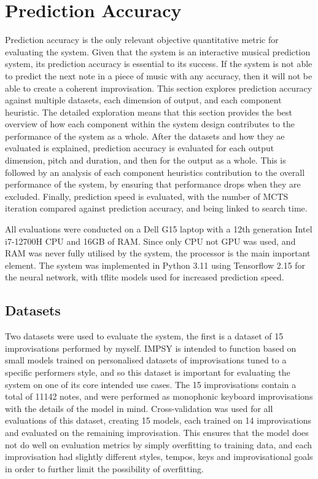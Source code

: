 \section{Prediction Accuracy}
Prediction accuracy is the only relevant objective quantitative metric for evaluating the system. Given that the system is an interactive musical prediction system, its prediction accuracy is essential to its success. If the system is not able to predict the next note in a piece of music with any accuracy, then it will not be able to create a coherent improvisation. This section explores prediction accuracy against multiple datasets, each dimension of output, and each component heuristic. The detailed exploration means that this section provides the best overview of how each component within the system design contributes to the performance of the system as a whole. After the datasets and how they ae evaluated is explained, prediction accuracy is evaluated for each output dimension, pitch and duration, and then for the output as a whole. This is followed by an analysis of each component heuristics contribution to the overall performance of the system, by ensuring that performance drops when they are excluded. Finally, prediction speed is evaluated, with the number of MCTS iteration compared against prediction accuracy, and being linked to search time.

All evaluations were conducted on a Dell G15 laptop with a 12th generation Intel i7-12700H CPU and 16GB of RAM. Since only CPU not GPU was used, and RAM was never fully utilised by the system, the processor is the main important element. The system was implemented in Python 3.11 using Tensorflow 2.15 for the neural network, with tflite models used for increased prediction speed.

\subsection{Datasets}
Two datasets were used to evaluate the system, the first is a dataset of 15 improvisations performed by myself. IMPSY is intended to function based on small models trained on personalised datasets of improvisations tuned to a specific performers style, and so this dataset is important for evaluating the system on one of its core intended use cases. The 15 improvisations contain a total of 11142 notes, and were performed as monophonic keyboard improvisations with the details of the model in mind. Cross-validation was used for all evaluations of this dataset, creating 15 models, each trained on 14 improvisations and evaluated on the remaining improvisation. This ensures that the model does not do well on evaluation metrics by simply overfitting to training data, and each improvisation had slightly different styles, tempos, keys and improvisational goals in order to further limit the possibility of overfitting.

